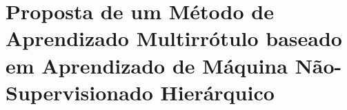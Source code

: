 

\chapter{Proposta de um Método de Aprendizado Multirrótulo baseado em Aprendizado de Máquina Não-Supervisionado Hierárquico}
\thispagestyle{empty} %




